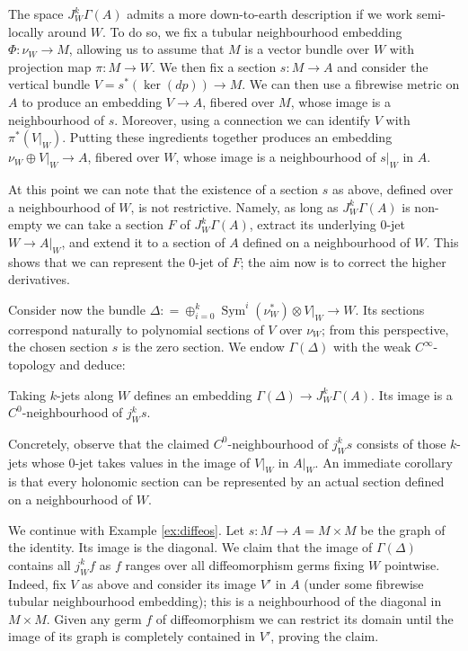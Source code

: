 \documentclass[10pt]{amsart}
\DeclareMathOperator{\Sym}{Sym}
\numberwithin{theoremalpha}{section}
\numberwithin{equation}{section}
\numberwithin{definition}{section}
\numberwithin{theorem}{section}
\numberwithin{proposition}{section}
\numberwithin{lemma}{section}
\numberwithin{example}{section}
\numberwithin{remark}{section}
\numberwithin{corollary}{section}
\numberwithin{question}{section}
\numberwithin{problem}{section}
\numberwithin{assumption}{section}
\theoremstyle{named}
\numberwithin{equation}{section}
\begin{document}
The space $J^k_W\Gamma(A)$ admits a more down-to-earth description if we work semi-locally around $W$. To do so, we fix a tubular neighbourhood embedding $\Phi: \nu_{W} \to M$, allowing us to assume that $M$ is a vector bundle over $W$ with projection map $\pi: M \to W$. We then fix a section $s : M \to A$ and consider the vertical bundle $V = s^*(\ker(dp)) \to M$. We can then use a fibrewise metric on $A$ to produce an embedding $V \rightarrow A$, fibered over $M$, whose image is a neighbourhood of $s$. Moreover, using a connection we can identify $V$ with $\pi^*(V|_W)$. Putting these ingredients together produces an embedding $\nu_{W} \oplus V|_W \rightarrow A$, fibered over $W$, whose image is a neighbourhood of $s|_W$ in $A$.

At this point we can note that the existence of a section $s$ as above, defined over a neighbourhood of $W$, is not restrictive. Namely, as long as $J^k_W\Gamma(A)$ is non-empty we can take a section $F$ of $J^k_W\Gamma(A)$, extract its underlying $0$-jet $W \rightarrow A|_W$, and extend it to a section of $A$ defined on a neighbourhood of $W$. This shows that we can represent the $0$-jet of $F$; the aim now is to correct the higher derivatives.

Consider now the bundle $\Delta: = \oplus_{i = 0}^k \Sym^{i}(\nu_{W}^*) \otimes V|_W \to W$. Its sections correspond naturally to polynomial sections of $V$ over $\nu_{W}$; from this perspective, the chosen section $s$ is the zero section. We endow $\Gamma(\Delta)$ with the weak $C^\infty$-topology and deduce:
\begin{lemma} \label{lem:polynomialRepresentatives}
Taking $k$-jets along $W$ defines an embedding $\Gamma(\Delta) \rightarrow J^k_W\Gamma(A)$. Its image is a $C^0$-neighbourhood of $j^k_W s$.
\end{lemma}
Concretely, observe that the claimed $C^0$-neighbourhood of $j^k_W s$ consists of those $k$-jets whose $0$-jet takes values in the image of $V|_W$ in $A|_W$. An immediate corollary is that every holonomic section can be represented by an actual section defined on a neighbourhood of $W$.

\begin{example}
We continue with Example \ref{ex:diffeos}. Let $s: M \rightarrow A = M \times M$ be the graph of the identity. Its image is the diagonal. We claim that the image of $\Gamma(\Delta)$ contains all $j^k_Wf$ as $f$ ranges over all diffeomorphism germs fixing $W$ pointwise. Indeed, fix $V$ as above and consider its image $V'$ in $A$ (under some fibrewise tubular neighbourhood embedding); this is a neighbourhood of the diagonal in $M \times M$. Given any germ $f$ of diffeomorphism we can restrict its domain until the image of its graph is completely contained in $V'$, proving the claim.
\end{example}
\end{document}
